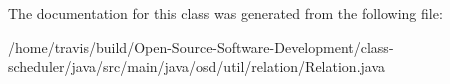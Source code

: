 The documentation for this class was generated from the following file\-:\begin{DoxyCompactItemize}
\item 
/home/travis/build/\-Open-\/\-Source-\/\-Software-\/\-Development/class-\/scheduler/java/src/main/java/osd/util/relation/Relation.\-java\end{DoxyCompactItemize}
